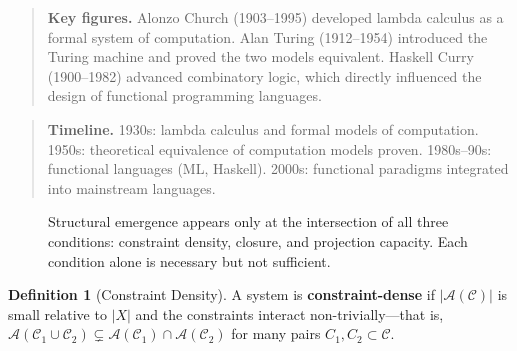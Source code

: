 \documentclass[11pt]{book}
\theoremstyle{plain}
\theoremstyle{definition}
\newtheorem{definition}[theorem]{Definition}
\theoremstyle{remark}
\newcommand{\C}{\mathcal{C}}
\newcommand{\A}{\mathcal{A}}
\newenvironment{historicalfigures}
  {\begin{quote}\small\textbf{Key figures.}\enspace\ignorespaces}
  {\end{quote}}
\newenvironment{paradigmtimeline}
  {\begin{quote}\small\textbf{Timeline.}\enspace\ignorespaces}
  {\end{quote}}
\begin{document}
\begin{historicalfigures}
Alonzo Church (1903--1995) developed lambda calculus as a formal system
of computation. Alan Turing (1912--1954) introduced the Turing machine
and proved the two models equivalent. Haskell Curry (1900--1982) advanced
combinatory logic, which directly influenced the design of functional
programming languages.
\end{historicalfigures}

\begin{paradigmtimeline}
1930s: lambda calculus and formal models of computation. \quad
1950s: theoretical equivalence of computation models proven. \quad
1980s--90s: functional languages (ML, Haskell). \quad
2000s: functional paradigms integrated into mainstream languages.
\end{paradigmtimeline}

\begin{figure}[h]
\centering
{}
\caption{Structural emergence appears only at the intersection of all three conditions:
constraint density, closure, and projection capacity. Each condition alone is necessary
but not sufficient.}
\end{figure}

\begin{definition}[Constraint Density]
A system is \textbf{constraint-dense} if $|\A(\C)|$ is small relative to
$|X|$ and the constraints interact non-trivially---that is, $\A(\C_1 \cup
\C_2) \subsetneq \A(\C_1) \cap \A(\C_2)$ for many pairs $C_1, C_2 \subset \C$.
\end{definition}
\end{document}
